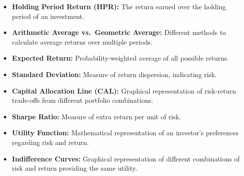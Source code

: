 \documentclass[
]{book}
\providecommand{\tightlist}{%
  \setlength{\itemsep}{0pt}\setlength{\parskip}{0pt}}
\begin{document}
\begin{itemize}
\tightlist
\item
  \textbf{Holding Period Return (HPR):} The return earned over the holding period of an investment.
\item
  \textbf{Arithmetic Average vs.~Geometric Average:} Different methods to calculate average returns over multiple periods.
\item
  \textbf{Expected Return:} Probability-weighted average of all possible returns.
\item
  \textbf{Standard Deviation:} Measure of return dispersion, indicating risk.
\item
  \textbf{Capital Allocation Line (CAL):} Graphical representation of risk-return trade-offs from different portfolio combinations.
\item
  \textbf{Sharpe Ratio:} Measure of extra return per unit of risk.
\item
  \textbf{Utility Function:} Mathematical representation of an investor's preferences regarding risk and return.
\item
  \textbf{Indifference Curves:} Graphical representation of different combinations of risk and return providing the same utility.
\end{itemize}
\end{document}
